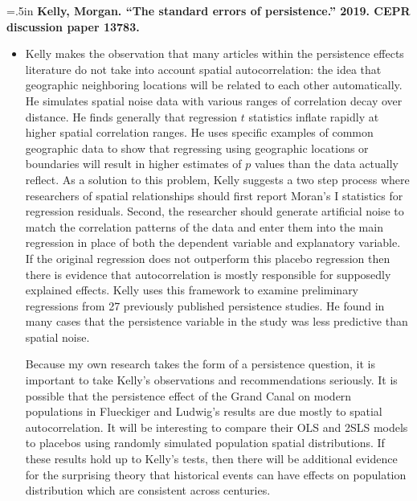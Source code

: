 \documentclass[11pt]{article}
\begin{document}
\hangindent=.5in
\textbf{Kelly, Morgan. “The standard errors of persistence.” 2019. CEPR discussion paper 13783.}
\begin{itemize}
    \item[~]
    Kelly makes the observation that many articles within the persistence effects literature do not take into account spatial autocorrelation: the idea that geographic neighboring locations will be related to each other automatically. He simulates spatial noise data with various ranges of correlation decay over distance. He finds generally that regression $t$ statistics inflate rapidly at higher spatial correlation ranges. He uses specific examples of common geographic data to show that regressing using geographic locations or boundaries will result in higher estimates of $p$ values than the data actually reflect. As a solution to this problem, Kelly suggests a two step process where researchers of spatial relationships should first report Moran’s I statistics for regression residuals. Second, the researcher should generate artificial noise to match the correlation patterns of the data and enter them into the main regression in place of both the dependent variable and explanatory variable. If the original regression does not outperform this placebo regression then there is evidence that autocorrelation is mostly responsible for supposedly explained effects. Kelly uses this framework to examine preliminary regressions from 27 previously published persistence studies. He found in  many cases that the persistence variable in the study was less predictive than spatial noise. 
    
    Because my own research takes the form of a persistence question, it is important to take Kelly’s observations and recommendations seriously. It is possible that the persistence effect of the Grand Canal on modern populations in Flueckiger and Ludwig’s results are due mostly to spatial autocorrelation. It will be interesting to compare their OLS and 2SLS models to placebos using randomly simulated population spatial distributions. If these results hold up to Kelly’s tests, then there will be additional evidence for the surprising theory that historical events can have effects on population distribution which are consistent across centuries. 

\end{itemize}
\end{document}
